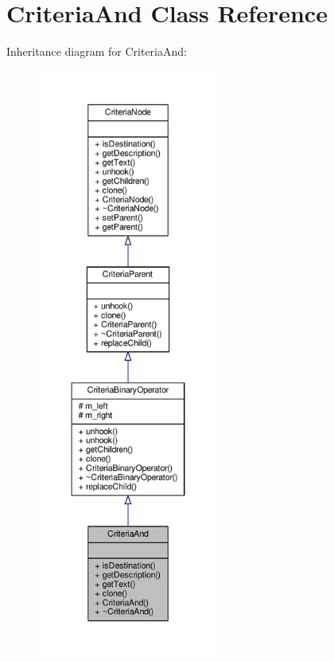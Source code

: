 \hypertarget{classCriteriaAnd}{}\section{Criteria\+And Class Reference}
\label{classCriteriaAnd}


Inheritance diagram for Criteria\+And\+:
\nopagebreak
\begin{figure}[H]
\begin{center}
\leavevmode
\includegraphics[height=550pt]{d7/dff/classCriteriaAnd__inherit__graph}
\end{center}
\end{figure}



